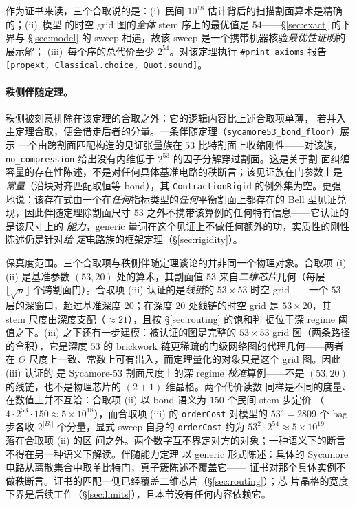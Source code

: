 \documentclass[11pt]{ctexart}
\begin{document}
作为证书来读，三个合取说的是：(i)~民间 $10^{18}$ 估计背后的扫描割面算术是精确的；(ii)~模型
的时空 grid 图的\emph{全体} stem 序上的最优值是 $54$——\S\ref{sec:exact} 的下界与
\S\ref{sec:model} 的 sweep 相遇，故该 sweep 是一个携带机器核验\emph{最优性证明}的展示解；
(iii)~每个序的总代价至少 $2^{54}$。对该定理执行
\texttt{\#print axioms} 报告 \texttt{[propext, Classical.choice, Quot.sound]}。

\paragraph{秩侧伴随定理。}秩侧被刻意排除在该定理的合取之外：它的逻辑内容比上述合取项单薄，
若并入主定理合取，便会借走后者的分量。一条伴随定理（\texttt{sycamore53\_bond\_floor}）展示
一个由跨割面匹配构造的见证张量族在 $53$ 比特割面上收缩刚性——对该族，
\texttt{no\_compression} 给出没有内维低于 $2^{53}$ 的因子分解穿过割面。这是关于割
面纠缠容量的存在性陈述，不是对任何具体基准电路的秩断言；该见证族在门参数上是
\emph{常量}（沿块对齐匹配取恒等 bond），其 \texttt{ContractionRigid} 的例外集为空。更强
地说：该存在式由一个在\emph{任何}指标类型的\emph{任何}平衡割面上都存在的 Bell 型见证兑
现，因此伴随定理除割面尺寸 $53$ 之外不携带该算例的任何特有信息——它认证的是该尺寸上的
\emph{能力}，generic 量词在这个见证上不做任何额外的功，实质性的刚性陈述仍是针对\emph{给
定}电路族的框架定理（\S\ref{sec:rigidity}）。

保真度范围。三个合取项与秩侧伴随定理谈论的并非同一个物理对象。合取项 (i)--(ii) 是基准参数
$(53,20)$ 处的算术，其割面值 $53$ 来自\emph{二维芯片}几何（每层
$\lfloor\sqrt{n}\rfloor$ 个跨割面门）。合取项 (iii) 认证的是\emph{线链}的 $53\times53$
时空 grid——一个 $53$ 层的深窗口，超过基准深度 $20$；在深度 $20$ 处线链的时空 grid 是
$53\times20$，其 stem 尺度由深度支配（$\approx 21$），且按 \S\ref{sec:routing} 的饱和判
据位于深 regime 阈值之下。(iii) 之下还有一步建模：被认证的图是完整的 $53\times53$ grid
图（两条路径的盒积），它是深度 $53$ 的 brickwork 链更稀疏的门级网络图的代理几何——两者在
$\Theta$ 尺度上一致、常数上可有出入，而定理量化的对象只是这个 grid 图。因此 (iii) 认证的
是 Sycamore-53 割面尺度上的深 regime
\emph{校准}算例——不是 $(53,20)$ 的线链，也不是物理芯片的 $(2{+}1)$ 维晶格。两个代价读数
同样是不同的度量、在数值上并不互洽：合取项 (ii) 以 bond 语义为 $150$ 个民间 stem 步定价
（$4\cdot 2^{53}\cdot 150\approx 5\times10^{18}$），而合取项 (iii) 的 \texttt{orderCost}
对模型的 $53^2=2809$ 个 bag 步各收 $2^{|B_t|}$ 个分量，显式 sweep 自身的
\texttt{orderCost} 约为 $53^2\cdot 2^{54}\approx 5\times10^{19}$——落在合取项 (ii) 的区
间之外。两个数字互不界定对方的对象；一种语义下的断言不得在另一种语义下解读。伴随能力定理
以 generic 形式陈述：具体的 Sycamore 电路从离散集合中取单比特门，真子簇陈述不覆盖它——
证书对那个具体实例不做秩断言。证书的匹配一侧已经覆盖二维芯片（\S\ref{sec:routing}）；芯
片晶格的宽度下界是后续工作（\S\ref{sec:limits}），且本节没有任何内容依赖它。
\end{document}
